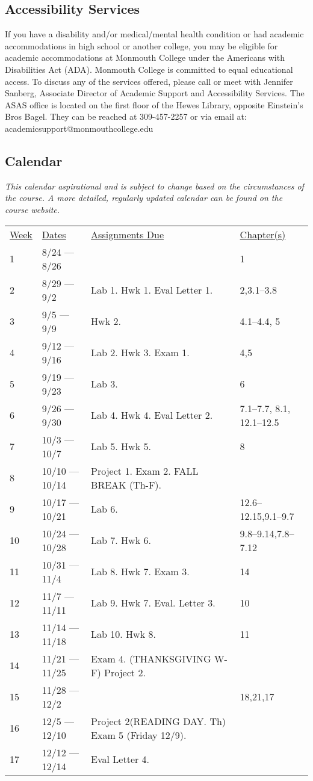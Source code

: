 \documentclass[10pt]{article}
\begin{document}
\subsection*{Accessibility Services}
If you have a disability and/or medical/mental health condition or had academic accommodations in high school or another college, you may be eligible for academic accommodations at Monmouth College under the Americans with Disabilities Act (ADA). Monmouth College is committed to equal educational access. To discuss any of the services offered, please call or meet with Jennifer Sanberg, Associate Director of Academic Support and Accessibility Services. The ASAS office is located on the first floor of the Hewes Library, opposite Einstein’s Bros Bagel. They can be reached at 309-457-2257 or via email at: academicsupport@monmouthcollege.edu

\subsection{Calendar}

\textit{This calendar aspirational and is subject to change based on the circumstances of the course. A more detailed, regularly updated calendar can be found on the course website. }

\begin{center}
\begin{tabular}{llll}
\underline{Week} & \underline{Dates} & \underline{Assignments Due} & \underline{Chapter(s)}\\
1 & 8/24 --- 8/26  &  &  1\\
2 & 8/29 --- 9/2 & Lab 1. Hwk 1. Eval Letter 1. & 2,3.1--3.8\\
3 & 9/5 --- 9/9 &  Hwk 2. &  4.1--4.4, 5  \\
4 & 9/12 --- 9/16  & Lab 2. Hwk 3. Exam 1.  &   4,5 \\
5 & 9/19 --- 9/23 & Lab 3.  & 6 \\
6 & 9/26 --- 9/30 & Lab 4. Hwk 4. Eval Letter 2. & 7.1--7.7, 8.1, 12.1--12.5 \\
7 & 10/3 --- 10/7 & Lab 5. Hwk 5. &   8 \\
8 & 10/10 --- 10/14 & Project 1. Exam 2. FALL BREAK (Th-F). &   \\
9 & 10/17 --- 10/21  & Lab 6. & 12.6--12.15,9.1--9.7  \\
10 & 10/24 --- 10/28  & Lab 7. Hwk 6. &  9.8--9.14,7.8--7.12  \\
11 & 10/31 --- 11/4 &  Lab 8. Hwk 7. Exam 3. &  14 \\
12 & 11/7 --- 11/11 &  Lab 9. Hwk 7. Eval. Letter 3. & 10 \\
13 & 11/14 --- 11/18 & Lab 10. Hwk 8.  &  11 \\
14 & 11/21 --- 11/25 &  Exam 4. (THANKSGIVING W-F) Project 2. &  \\
15 & 11/28 --- 12/2 &   &  18,21,17 \\
16 & 12/5 --- 12/10 & Project 2(READING DAY. Th) Exam 5 (Friday 12/9). &  \\
17 & 12/12 --- 12/14 & Eval Letter 4.
\end{tabular}
\end{center}
\end{document}

